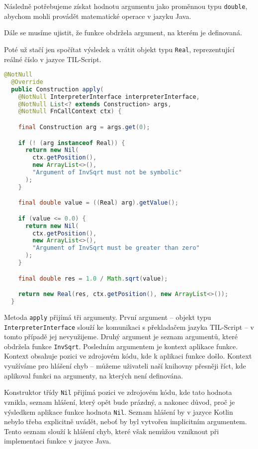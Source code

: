 Následně potřebujeme získat hodnotu argumentu jako proměnnou typu \lstinline{double}, abychom
mohli provádět matematické operace v jazyku Java.

Dále se musíme ujistit, že funkce obdržela argument, na kterém je definovaná.

Poté už stačí jen spočítat výsledek a vrátit objekt typu \lstinline{Real}, reprezentující reálné
číslo v jazyce TIL-Script.

\begin{lstlisting}[caption={Konstruktor InvSqrt}, language=Java]
  @NotNull
  @Override
  public Construction apply(
    @NotNull InterpreterInterface interpreterInterface,
    @NotNull List<? extends Construction> args,
    @NotNull FnCallContext ctx) {

    final Construction arg = args.get(0);

    if (! (arg instanceof Real)) {
      return new Nil(
        ctx.getPosition(),
        new ArrayList<>(),
        "Argument of InvSqrt must not be symbolic"
      );
    }

    final double value = ((Real) arg).getValue();

    if (value <= 0.0) {
      return new Nil(
        ctx.getPosition(),
        new ArrayList<>(),
        "Argument of InvSqrt must be greater than zero"
      );
    }

    final double res = 1.0 / Math.sqrt(value);

    return new Real(res, ctx.getPosition(), new ArrayList<>());
  }
\end{lstlisting}

Metoda \lstinline{apply} přijímá tři argumenty. První argument -- objekt typu
\lstinline{InterpreterInterface} slouží ke komunikaci s překladačem jazyka TIL-Script -- v tomto
případě jej nevyužijeme. Druhý argument je seznam argumentů, které obdržela funkce
\lstinline{InvSqrt}. Posledním argumentem je kontext aplikace funkce. Kontext obsahuje pozici
ve zdrojovém kódu, kde k aplikaci funkce došlo. Kontext využíváme pro hlášení chyb -- můžeme
uživateli naší knihovny přesněji říct, kde aplikoval funkci na argumenty, na kterých není
definována.

Konstruktor třídy \lstinline{Nil} přijímá pozici ve zdrojovém kódu, kde tato hodnota vznikla,
seznam hlášení, který opět bude prázdný, a nakonec důvod, proč je výsledkem aplikace funkce hodnota
\lstinline{Nil}. Seznam hlášení by v jazyce Kotlin nebylo třeba explicitně uvádět, neboť by byl
vytvořen implicitním argumentem. Tento seznam slouží k hlášení chyb, které však nemůžou vzniknout
při implementaci funkce v jazyce Java.

